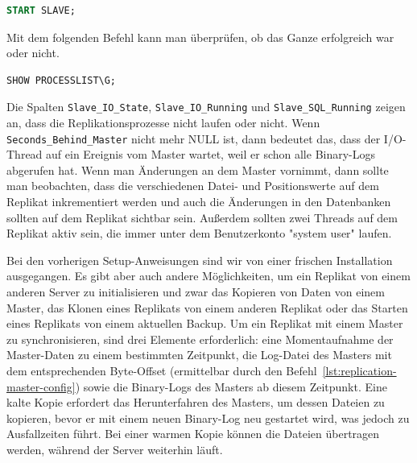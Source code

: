 \vspace{-8pt}
\begin{lstlisting}[language=SQL,caption=Starten der Replikation,label={lst:replication-replica-start}]
START SLAVE;
\end{lstlisting}
\vspace{-5pt}

Mit dem folgenden Befehl kann man überprüfen, ob das Ganze erfolgreich war oder nicht.

\vspace{-8pt}
\begin{lstlisting}[language=SQL,caption=Status der Replica,label={lst:replication-replica-status}]
SHOW PROCESSLIST\G;
\end{lstlisting}
\vspace{-5pt}

Die Spalten \texttt{Slave\_IO\_State}, \texttt{Slave\_IO\_Running} und \texttt{Slave\_SQL\_Running} zeigen an, dass die Replikationsprozesse nicht laufen oder nicht.
Wenn \texttt{Seconds\_Behind\_Master} nicht mehr NULL ist, dann bedeutet das, dass der I/O-Thread auf ein Ereignis vom Master wartet, weil er schon alle Binary-Logs abgerufen hat.
Wenn man Änderungen an dem Master vornimmt, dann sollte man beobachten, dass die verschiedenen Datei- und Positionswerte auf dem Replikat inkrementiert werden und auch die Änderungen in den Datenbanken sollten auf dem Replikat sichtbar sein.
Außerdem sollten zwei Threads auf dem Replikat aktiv sein, die immer unter dem Benutzerkonto "system user" laufen.

Bei den vorherigen Setup-Anweisungen sind wir von einer frischen Installation ausgegangen.
Es gibt aber auch andere Möglichkeiten, um ein Replikat von einem anderen Server zu initialisieren und zwar das Kopieren von Daten von einem Master, das Klonen eines Replikats von einem anderen Replikat oder das Starten eines Replikats von einem aktuellen Backup.
Um ein Replikat mit einem Master zu synchronisieren, sind drei Elemente erforderlich: eine Momentaufnahme der Master-Daten zu einem bestimmten Zeitpunkt, die Log-Datei des Masters mit dem entsprechenden Byte-Offset (ermittelbar durch den Befehl~\ref{lst:replication-master-config}) sowie die Binary-Logs des Masters ab diesem Zeitpunkt.
Eine kalte Kopie erfordert das Herunterfahren des Masters, um dessen Dateien zu kopieren, bevor er mit einem neuen Binary-Log neu gestartet wird, was jedoch zu Ausfallzeiten führt.
Bei einer warmen Kopie können die Dateien übertragen werden, während der Server weiterhin läuft.

